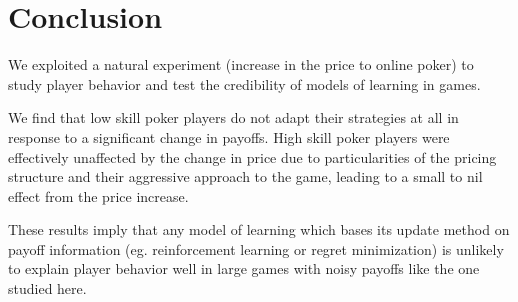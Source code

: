 \documentclass[12pt]{article}
\begin{document}
\section{Conclusion} \label{sec:conclusion}

We exploited a natural experiment (increase in the price to online poker) to study player behavior and test the credibility of models of learning in games.

We find that low skill poker players do not adapt their strategies at all in response to a significant change in payoffs. High skill poker players were effectively unaffected by the change in price due to particularities of the pricing structure and their aggressive approach to the game, leading to a small to nil effect from the price increase.

These results imply that any model of learning which bases its update method on payoff information (eg. reinforcement learning or regret minimization) is unlikely to explain player behavior well in large games with noisy payoffs like the one studied here.

\singlespacing
\setlength\bibsep{0pt}





\clearpage

\onehalfspacing
\end{document}
